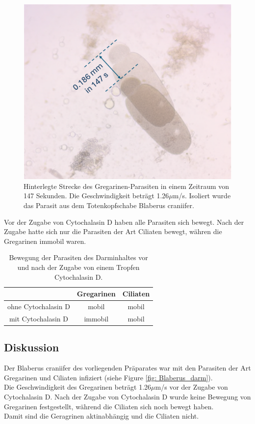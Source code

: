 \documentclass[oneside,10pt,a4paper]{report}
\begin{document}
				\begin{figure}[H]
					\centering
					\includegraphics[scale=0.7]{apicomplexa_geschwindigkeit.png}
					\caption{Hinterlegte Strecke des Gregarinen-Parasiten in einem Zeitraum von 147 Sekunden. Die Geschwindigkeit beträgt 1.26$\mu$m/s. Isoliert wurde das Parasit aus dem Totenkopfschabe Blaberus craniifer.}
					\label{fig: natives Apicomplexabewegung}
				\end{figure}
				
				Vor der Zugabe von Cytochalasin D haben alle Parasiten sich bewegt. Nach der Zugabe hatte sich nur die Parasiten der Art Ciliaten bewegt, währen die Gregarinen immobil waren.
				\begin{table}[H]
					\centering
					\caption{Bewegung der Parasiten des Darminhaltes vor und nach der Zugabe von einem Tropfen Cytochalasin D.}
					\label{tab: aktinhem}
					\begin{tabular}{ccc}
						\toprule
						&Gregarinen & Ciliaten\\
						\midrule
						ohne Cytochalasin D & mobil & mobil \\
						mit Cytochalasin D & immobil & mobil\\
						\bottomrule			
					\end{tabular}
				\end{table}
				
			\subsection{Diskussion}
			Der Blaberus craniifer des vorliegenden Präparates war mit den Parasiten der Art Gregarinen und Ciliaten infiziert (siehe Figure \ref{fig: Blaberus_darm}).\\
			Die Geschwindigkeit des Gregarinen beträgt 1.26$\mu$m/s vor der Zugabe von Cytochalasin D. Nach der Zugabe von Cytochalasin D wurde keine Bewegung von Gregarinen festgestellt, während die Ciliaten sich noch bewegt haben.\\
			Damit sind die Geragrinen aktinabhängig und die Ciliaten nicht.
	
\end{document}
